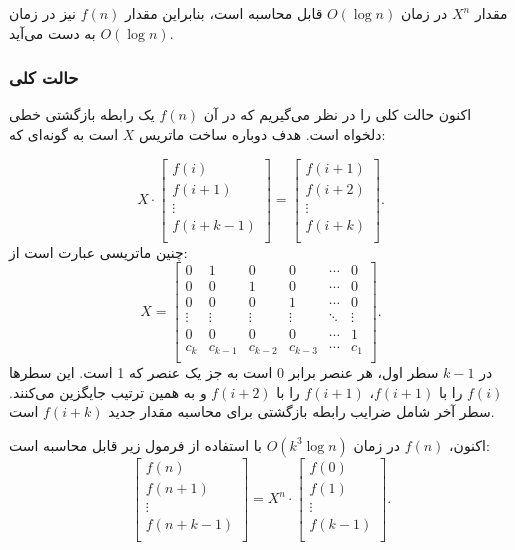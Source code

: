 مقدار $X^n$ در زمان $O(\log n)$ قابل محاسبه است،
بنابراین مقدار $f(n)$ نیز در زمان $O(\log n)$ به دست می‌آید.

\subsubsection{حالت کلی}

اکنون حالت کلی را در نظر می‌گیریم که در آن
$f(n)$ یک رابطه بازگشتی خطی دلخواه است.
هدف دوباره ساخت ماتریس $X$ است به گونه‌ای که:

\[ X \cdot
 \begin{bmatrix}
  f(i) \\
  f(i+1) \\
  \vdots \\
  f(i+k-1) \\
 \end{bmatrix}
=
 \begin{bmatrix}
  f(i+1) \\
  f(i+2) \\
  \vdots \\
  f(i+k) \\
 \end{bmatrix}.
\]
چنین ماتریسی عبارت است از:
\[
X =
 \begin{bmatrix}
  0 & 1 & 0 & 0 & \cdots & 0 \\
  0 & 0 & 1 & 0 & \cdots & 0 \\
  0 & 0 & 0 & 1 & \cdots & 0 \\
  \vdots & \vdots & \vdots & \vdots & \ddots & \vdots \\
  0 & 0 & 0 & 0 & \cdots & 1 \\
  c_k & c_{k-1} & c_{k-2} & c_{k-3} & \cdots & c_1 \\
 \end{bmatrix}.
\]
در $k-1$ سطر اول، هر عنصر برابر 0 است
به جز یک عنصر که 1 است.
این سطرها $f(i)$ را با $f(i+1)$،
$f(i+1)$ را با $f(i+2)$ و به همین ترتیب جایگزین می‌کنند.
سطر آخر شامل ضرایب رابطه بازگشتی برای محاسبه مقدار جدید $f(i+k)$ است.

\begin{samepage}
اکنون، $f(n)$ در زمان $O(k^3 \log n)$ با استفاده از فرمول زیر قابل محاسبه است:
\[
 \begin{bmatrix}
  f(n) \\
  f(n+1) \\
  \vdots \\
  f(n+k-1) \\
 \end{bmatrix}
=
X^n \cdot
 \begin{bmatrix}
  f(0) \\
  f(1) \\
  \vdots \\
  f(k-1) \\
 \end{bmatrix}.
\]
\end{samepage}

